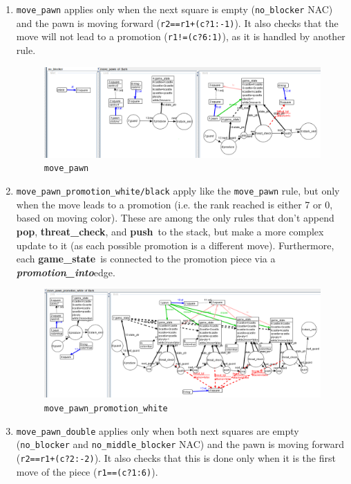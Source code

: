 \documentclass[a4paper, 10pt]{scrartcl}
\newcommand{\noderepr}[1]{\textsf{\textbf{#1}}}
\newcommand{\edgerepr}[1]{\textit{\textbf{#1}}}
\newcommand{\gamestate}{\noderepr{game\_state}}
\newcommand{\push}{\noderepr{push}}
\newcommand{\pop}{\noderepr{pop}}
\newcommand{\threatcheck}{\noderepr{threat\_check}}
\newcommand{\promotioninto}{\edgerepr{promotion\_into}}
\begin{document}
    \begin{enumerate}
        \item \texttt{move\_pawn} applies only when the next square is empty (\texttt{no\_blocker} NAC) and the pawn is moving forward (\texttt{r2==r1+(c?1:-1)}). It also checks that the move will not lead to a promotion (\texttt{r1!=(c?6:1)}), as it is handled by another rule.
        \begin{figure}[H]
            \centering
            \includegraphics[width=.8\linewidth]{images/move_pawn.png}
            \caption{\texttt{move\_pawn}}
        \end{figure}
        \item \texttt{move\_pawn\_promotion\_white/black} apply like the \texttt{move\_pawn} rule, but only when the move leads to a promotion (i.e. the rank reached is either 7 or 0, based on moving color). These are among the only rules that don't append \pop, \threatcheck, and \push\ to the stack, but make a more complex update to it (as each possible promotion is a different move). Furthermore, each \gamestate\ is connected to the promotion piece via a \promotioninto edge.
        \begin{figure}[H]
            \centering
            \includegraphics[width=.8\linewidth]{images/move_pawn_promotion_white.png}
            \caption{\texttt{move\_pawn\_promotion\_white}}
        \end{figure}
        \item \texttt{move\_pawn\_double} applies only when both next squares are empty (\texttt{no\_blocker} and \texttt{no\_middle\_blocker} NAC) and the pawn is moving forward (\texttt{r2==r1+(c?2:-2)}). It also checks that this is done only when it is the first move of the piece (\texttt{r1==(c?1:6)}).

\end{enumerate}
\end{document}
